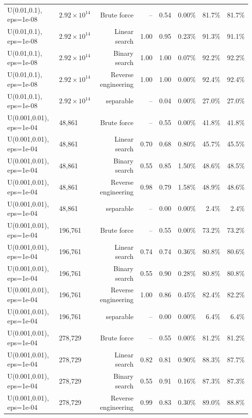 \begin{tabular}{llrrrrrr}
U(0.01,0.1), eps=1e-08 & $2.92\times 10^{14}$ & Brute force & -- & 0.54 & 0.00\% & 81.7\% & 81.7\% \\
U(0.01,0.1), eps=1e-08 & $2.92\times 10^{14}$ & Linear search & 1.00 & 0.95 & 0.23\% & 91.3\% & 91.1\% \\
U(0.01,0.1), eps=1e-08 & $2.92\times 10^{14}$ & Binary search & 1.00 & 1.00 & 0.07\% & 92.2\% & 92.2\% \\
U(0.01,0.1), eps=1e-08 & $2.92\times 10^{14}$ & Reverse engineering & 1.00 & 1.00 & 0.00\% & 92.4\% & 92.4\% \\
U(0.01,0.1), eps=1e-08 & $2.92\times 10^{14}$ & separable & -- & 0.04 & 0.00\% & 27.0\% & 27.0\% \\
U(0.001,0.01), eps=1e-04 & 48,861 & Brute force & -- & 0.55 & 0.00\% & 41.8\% & 41.8\% \\
U(0.001,0.01), eps=1e-04 & 48,861 & Linear search & 0.70 & 0.68 & 0.80\% & 45.7\% & 45.5\% \\
U(0.001,0.01), eps=1e-04 & 48,861 & Binary search & 0.55 & 0.85 & 1.50\% & 48.6\% & 48.5\% \\
U(0.001,0.01), eps=1e-04 & 48,861 & Reverse engineering & 0.98 & 0.79 & 1.58\% & 48.9\% & 48.6\% \\
U(0.001,0.01), eps=1e-04 & 48,861 & separable & -- & 0.00 & 0.00\% & 2.4\% & 2.4\% \\
U(0.001,0.01), eps=1e-04 & 196,761 & Brute force & -- & 0.55 & 0.00\% & 73.2\% & 73.2\% \\
U(0.001,0.01), eps=1e-04 & 196,761 & Linear search & 0.74 & 0.74 & 0.36\% & 80.8\% & 80.6\% \\
U(0.001,0.01), eps=1e-04 & 196,761 & Binary search & 0.55 & 0.90 & 0.28\% & 80.8\% & 80.8\% \\
U(0.001,0.01), eps=1e-04 & 196,761 & Reverse engineering & 1.00 & 0.86 & 0.45\% & 82.4\% & 82.2\% \\
U(0.001,0.01), eps=1e-04 & 196,761 & separable & -- & 0.00 & 0.00\% & 6.4\% & 6.4\% \\
U(0.001,0.01), eps=1e-04 & 278,729 & Brute force & -- & 0.55 & 0.00\% & 81.2\% & 81.2\% \\
U(0.001,0.01), eps=1e-04 & 278,729 & Linear search & 0.82 & 0.81 & 0.90\% & 88.3\% & 87.7\% \\
U(0.001,0.01), eps=1e-04 & 278,729 & Binary search & 0.55 & 0.91 & 0.16\% & 87.3\% & 87.3\% \\
U(0.001,0.01), eps=1e-04 & 278,729 & Reverse engineering & 0.99 & 0.83 & 0.30\% & 89.0\% & 88.8\% \\

\end{tabular}
